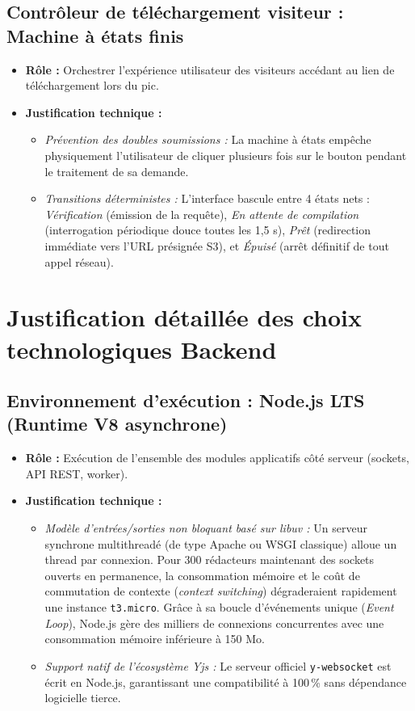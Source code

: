 \subsection{Contrôleur de téléchargement visiteur : Machine à états finis}
\begin{itemize}
    \item \textbf{Rôle :} Orchestrer l'expérience utilisateur des visiteurs accédant au lien de téléchargement lors du pic.
    \item \textbf{Justification technique :} 
    \begin{itemize}
        \item \emph{Prévention des doubles soumissions :} La machine à états empêche physiquement l'utilisateur de cliquer plusieurs fois sur le bouton pendant le traitement de sa demande.
        \item \emph{Transitions déterministes :} L'interface bascule entre 4 états nets : \textit{Vérification} (émission de la requête), \textit{En attente de compilation} (interrogation périodique douce toutes les 1,5 s), \textit{Prêt} (redirection immédiate vers l'URL présignée S3), et \textit{Épuisé} (arrêt définitif de tout appel réseau).
    \end{itemize}
\end{itemize}

\section{Justification détaillée des choix technologiques Backend}

\subsection{Environnement d'exécution : Node.js LTS (Runtime V8 asynchrone)}
\begin{itemize}
    \item \textbf{Rôle :} Exécution de l'ensemble des modules applicatifs côté serveur (sockets, API REST, worker).
    \item \textbf{Justification technique :} 
    \begin{itemize}
        \item \emph{Modèle d'entrées/sorties non bloquant basé sur libuv :} Un serveur synchrone multithreadé (de type Apache ou WSGI classique) alloue un thread par connexion. Pour 300 rédacteurs maintenant des sockets ouverts en permanence, la consommation mémoire et le coût de commutation de contexte (\emph{context switching}) dégraderaient rapidement une instance \texttt{t3.micro}. Grâce à sa boucle d'événements unique (\emph{Event Loop}), Node.js gère des milliers de connexions concurrentes avec une consommation mémoire inférieure à 150 Mo.
        \item \emph{Support natif de l'écosystème Yjs :} Le serveur officiel \texttt{y-websocket} est écrit en Node.js, garantissant une compatibilité à 100\,\% sans dépendance logicielle tierce.
    \end{itemize}
\end{itemize}


